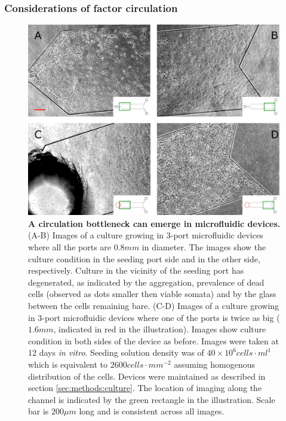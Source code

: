         \subsubsection{Considerations of factor circulation}
        \label{sec:devices:circulation}
        \begin{figure}[!htb]
           \centering
            \includegraphics[width=12.4cm]{chapter4/figures/volDensIssue/volDensIssue.jpg}
            \caption[Demonstration of the limitations of circulation in planar microfluidic devices]{\textbf{A circulation bottleneck can emerge in microfluidic devices.} (A-B) Images of a culture growing in 3-port microfluidic devices where all the ports are \(0.8 mm\) in diameter. The images show the culture condition in the seeding port side and in the other side, respectively. Culture in the vicinity of the seeding port has degenerated, as indicated by the aggregation, prevalence of dead cells (observed as dots smaller then viable somata) and by the glass between the cells remaining bare. (C-D) Images of a culture growing in 3-port microfluidic devices where one of the ports is twice as big (\(1.6 mm\), indicated in red in the illustration). Images show culture condition in both sides of the device as before. Images were taken at 12 days \textit{in vitro}. Seeding solution density was of \(40\times10^6 cells\cdot ml^{1}\) which is equivalent to \(2600 cells\cdot mm^{-2}\) assuming homogenous distribution of the cells. Devices were maintained as described in section \ref{sec:methods:culture}. The location of imaging along the channel is indicated by the green rectangle in the illustration. Scale bar is \(200 \mu m\) long and is consistent across all images.}
            \label{fig:devices:volDensIssue}
        \end{figure}
